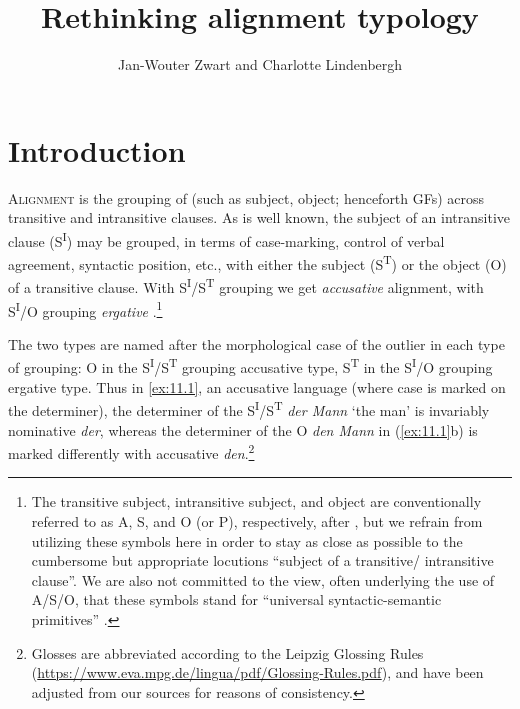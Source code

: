 \documentclass[output=paper]{langsci/langscibook}
\author{Jan-Wouter Zwart\affiliation{University of Groningen} and Charlotte Lindenbergh\affiliation{University of Groningen}}
\title{Rethinking alignment typology}
\begin{document}
\glsresetall
\maketitle

\section{Introduction}\label{sec:11.1}

\textsc{Alignment} is the grouping of  (such as
subject, object; henceforth \glspl{GF}) across transitive and
intransitive clauses. As is well known, the subject of an intransitive clause
(S\textsuperscript{I}) may be grouped, in terms of case-marking, control of
verbal agreement, syntactic position, etc., with either the subject
(S\textsuperscript{T}) or the object (O) of a transitive clause. With
S\textsuperscript{I}/S\textsuperscript{T} grouping we get \emph{accusative}
alignment, with S\textsuperscript{I}/O grouping \emph{ergative} 
\parencite{Plank1979,Dixon1994,Deal2015}.\footnote{The transitive subject,
    intransitive subject, and object are conventionally referred to as A, S,
    and O (or P), respectively, after \textcite[xxiii]{Dixon1972}, but we
    refrain from utilizing these symbols here in order to stay as close as
    possible to the cumbersome but appropriate locutions \enquote{subject of a
    transitive/ intransitive clause}. We are also not committed to the view,
    often underlying the use of A/S/O, that these symbols stand for “universal
    syntactic-semantic primitives” \citep[6]{Dixon1994}.}

The two  types are named after the morphological case of the outlier
in each type of grouping: O in the S\textsuperscript{I}/S\textsuperscript{T}
grouping accusative type, S\textsuperscript{T} in the S\textsuperscript{I}/O
grouping ergative type. Thus in  \eqref{ex:11.1}, an accusative language (where case
is marked on the determiner), the determiner of the
S\textsuperscript{I}/S\textsuperscript{T} \emph{der Mann} ‘the man’ is
invariably nominative \emph{der}, whereas the determiner of the O \emph{den
    Mann} in (\ref{ex:11.1}b) is marked differently with accusative
    \emph{den}.\footnote{Glosses are abbreviated according to the Leipzig
        Glossing Rules
        (\url{https://www.eva.mpg.de/lingua/pdf/Glossing-Rules.pdf}), and have
    been adjusted from our sources for reasons of consistency.}
\end{document}
